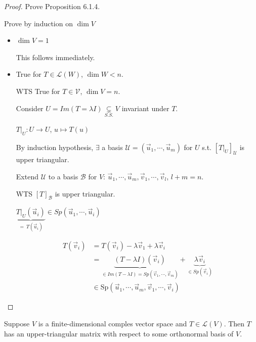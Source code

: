 \documentclass[11pt,fleqn]{book} %
\begin{document}
\begin{proof} Prove Proposition 6.1.4.

    Prove by induction on $\dim V$

    \begin{itemize}
        \item $\dim V = 1$

        This follows immediately.

        \item True for $T \in \mathcal{L}(W)$, $\dim W < n$.

        WTS True for $T \in \mathcal{V}$, $\dim V = n$.

        Consider $U = Im(T = \lambda I) \underset{S.S.}{\subsetneq} V$ invariant under $T$.

        $T\bigg|_U: U \to U$, $u \mapsto T(u)$

        By induction hypothesis, $\exists$ a basis $\mathcal{U} = (\vec{u}_1, \cdots, \vec{u}_m)$ for $U$ s.t. $[T\bigg|_U]_\mathcal{U}$ is upper triangular.

        Extend $\mathcal{U}$ to a basis $\mathcal{B}$ for $V$: $\vec{u}_1, \cdots, \vec{u}_m, \vec{v}_1, \cdots, \vec{v}_l$, $l + m = n$.

        WTS $[T]_\mathcal{B}$ is upper triangular.

        $\underbrace{T\bigg|_U(\vec{u}_i)}_{=~T(\vec{u}_i)} \in Sp(\vec{u}_1, \cdots, \vec{u}_i)$

        \begin{align*}
            T(\vec{v}_i)
            &= T(\vec{v}_i) - \lambda\vec{v}_1 + \lambda\vec{v}_i
            \\
            &= \underbrace{(T - \lambda I)(\vec{v}_i)}_{\in Im(T - \lambda I) = Sp(\vec{v}_1, \cdots, \vec{v}_m)} + \underbrace{\lambda \vec{v} _i}_{\in Sp(\vec{v}_i)}
            \\
            &\in \mathrm{Sp}(\vec{u}_1, \cdots, \vec{u}_m, \vec{v}_1, \cdots, \vec{v}_i)
        \end{align*}
    \end{itemize}
\end{proof}

\setcounter{section}{0}
\setcounter{dummy}{1}
\begin{theorem}
    Suppose $V$ is a finite-dimensional comples vector space and $T \in \mathcal{L}(V)$. Then $T$ has an upper-triangular matrix with respect to some orthonormal basis of $V$.
\end{theorem}
\setcounter{section}{1}
\end{document}
